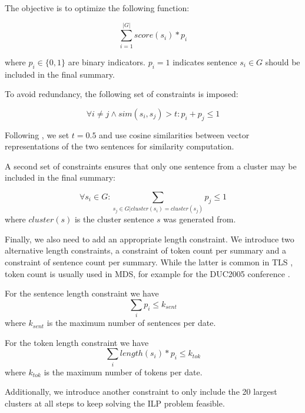 \documentclass[a4paper,BCOR=10mm]{report}
\numberwithin{lemma}{chapter}
\numberwithin{definition}{chapter}
\begin{document}
The objective is to optimize the following function:

\begin{equation}
\sum_{i = 1}^{|G|} \mathit{score}(s_i) * p_i
\end{equation}

where $p_i \in \{0, 1\}$ are binary indicators. $p_i = 1$ indicates sentence $s_i \in G$ should be included in the final summary.

To avoid redundancy, the following set of constraints is imposed:

\begin{equation}
\forall i \neq j \land \mathit{sim}(s_i, s_j) > t : p_i + p_{j} \leq 1
\end{equation}

Following \citet{banerjee}, we set $t = 0.5$ and use cosine similarities between vector representations of the two sentences for similarity computation.

A second set of constraints ensures that only one sentence from a cluster may be included in the final summary:

\begin{equation}
\forall s_i \in G: \sum_{s_j \in G | \mathit{cluster}(s_i) = \mathit{cluster}(s_j)} p_j \leq 1
\end{equation}
where $\mathit{cluster}(s)$ is the cluster sentence $s$ was generated from.

Finally, we also need to add an appropriate length constraint.
We introduce two alternative length constraints, a constraint of token count per summary and a constraint of sentence count per summary.
While the latter is common in TLS \citep{markert, yan-trans}, token count is usually used in MDS, for example for the DUC2005 conference \citep{duc2005}.

For the sentence length constraint we have
\begin{equation}
\sum_{i} p_i \leq k_{sent}
\end{equation}
where $k_{sent}$ is the maximum number of sentences per date.

For the token length constraint we have
\begin{equation}
\sum_{i} \mathit{length}(s_i) * p_i \leq k_{tok}
\end{equation}
where $k_{tok}$ is the maximum number of tokens per date.


Additionally, we introduce another constraint to only include the 20 largest clusters at all steps to keep solving the ILP problem feasible.
\end{document}
